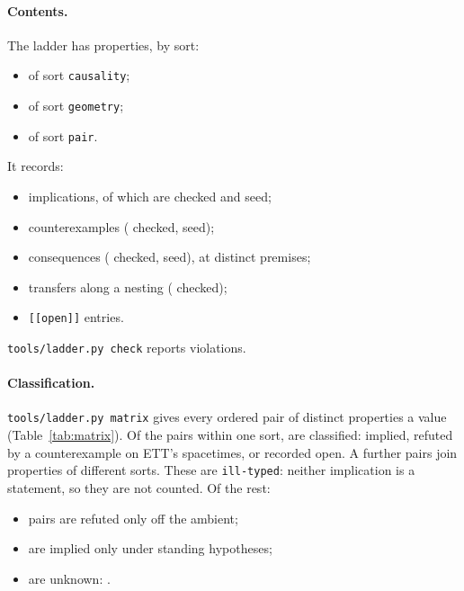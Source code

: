 \paragraph{Contents.} The ladder has \numLadderProperties{} properties, by sort:
\begin{itemize}
\item \numLadderSortCausality{} of sort \texttt{causality};
\item \numLadderSortGeometry{} of sort \texttt{geometry};
\item \numLadderSortPair{} of sort \texttt{pair}.
\end{itemize}
It records:
\begin{itemize}
\item \numLadderImplies{} implications, of which \numLadderImpliesChecked{} are checked and
  \numLadderImpliesSeed{} seed;
\item \numLadderFails{} counterexamples (\numLadderFailsChecked{} checked, \numLadderFailsSeed{}
  seed);
\item \numLadderConsequences{} consequences (\numLadderConsequenceChecked{} checked,
  \numLadderConsequenceSeed{} seed), at \numLadderConsequenceLevels{} distinct premises;
\item \numLadderTransfers{} transfers along a nesting (\numLadderTransferChecked{} checked);
\item \numLadderOpenEntries{} \texttt{[[open]]} entries.
\end{itemize}
\texttt{tools/ladder.py check} reports \numLadderViolations{} violations.

\paragraph{Classification.} \texttt{tools/ladder.py matrix} gives every ordered pair of distinct
properties a value (Table~\ref{tab:matrix}). Of the \numLadderWithin{} pairs within one sort,
\numLadderClassified{} are classified: implied, refuted by a counterexample on ETT's spacetimes, or
recorded open. A further \numLadderIllTyped{} pairs join properties of different sorts. These are \texttt{ill-typed}:
neither implication is a statement, so they are not counted. Of the rest:
\begin{itemize}
\item \numLadderClassFailsOff{} pairs are refuted only off the ambient;
\item \numLadderClassImpliedStanding{} are implied only under standing hypotheses;
\item \numLadderClassUnknown{} are unknown: \progLadderUnknownPairs.
\end{itemize}

